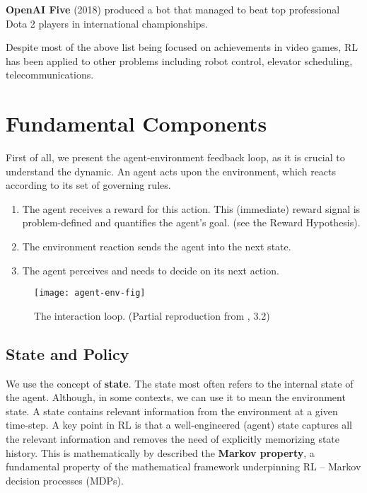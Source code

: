 \textbf{OpenAI Five}\cite{openai-dota} (2018) produced a bot that managed to beat top professional Dota 2 players in international championships.

Despite most of the above list being focused on achievements in video games, RL has been applied to other problems including robot control, elevator scheduling, telecommunications\cite{wiki:Reinforcement_learning}.

\section{Fundamental Components}

First of all, we present the agent-environment feedback loop, as it is crucial to understand the dynamic. An agent acts upon the environment, which reacts according to its set of governing rules.
\begin{enumerate}
    \item The agent receives a reward for this action. This (immediate) reward signal is problem-defined and quantifies the agent’s goal. (see the Reward Hypothesis).
    \item The environment reaction sends the agent into the next state.
    \item The agent perceives and needs to decide on its next action.
\end{enumerate}

\begin{figure}[h]
    \caption{The interaction loop. (Partial reproduction from \cite{rlai}, 3.2)}
    \centering
    \vspace*{0.5cm}
    \texttt{[image: agent-env-fig]}
\end{figure}

\subsection{State and Policy}

We use the concept of \textbf{state}. The state most often refers to the internal state of the agent. Although, in some contexts, we can use it to mean the environment state.
A state contains relevant information from the environment at a given time-step.
A key point in RL is that a well-engineered (agent) state captures all the relevant information and removes the need of explicitly memorizing state history.
This is mathematically by described the \textbf{Markov property}\cite{silver-lectures}, a fundamental property of the mathematical framework underpinning RL -- Markov decision processes (MDPs).

